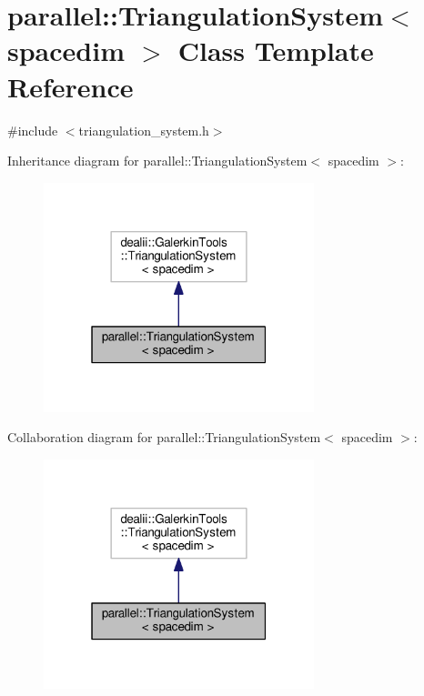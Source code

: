 \hypertarget{classparallel_1_1_triangulation_system}{}\section{parallel\+:\+:Triangulation\+System$<$ spacedim $>$ Class Template Reference}
\label{classparallel_1_1_triangulation_system}


{\ttfamily \#include $<$triangulation\+\_\+system.\+h$>$}



Inheritance diagram for parallel\+:\+:Triangulation\+System$<$ spacedim $>$\+:\nopagebreak
\begin{figure}[H]
\begin{center}
\leavevmode
\includegraphics[width=223pt]{classparallel_1_1_triangulation_system__inherit__graph}
\end{center}
\end{figure}


Collaboration diagram for parallel\+:\+:Triangulation\+System$<$ spacedim $>$\+:\nopagebreak
\begin{figure}[H]
\begin{center}
\leavevmode
\includegraphics[width=223pt]{classparallel_1_1_triangulation_system__coll__graph}
\end{center}
\end{figure}
